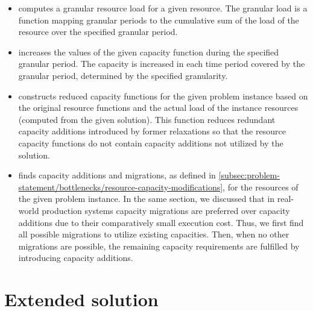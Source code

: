 \begin{itemize}
    \item {}
        computes a granular resource load for a given resource.
        The granular load is a function mapping granular periods to the cumulative sum of the load
        of the resource over the specified granular period.
        
    \item {}
        increases the values of the given capacity function during the specified granular period.
        The capacity is increased in each time period covered by the granular period,
        determined by the specified granularity.

    \item {}
        constructs reduced capacity functions for the given problem instance based on the original resource functions
        and the actual load of the instance resources (computed from the given solution).
        This function reduces redundant capacity additions introduced by former relaxations
        so that the resource capacity functions do not contain capacity additions not utilized by the solution.

    \item {}
        finds capacity additions and migrations,
        as defined in \cref{subsec:problem-statement/bottlenecks/resource-capacity-modifications},
        for the resources of the given problem instance.
        In the same section,
        we discussed that in real-world production systems
        capacity migrations are preferred over capacity additions due to their comparatively small execution cost.
        Thus, we first find all possible migrations to utilize existing capacities.
        Then, when no other migrations are possible, the remaining capacity requirements are fulfilled
        by introducing capacity additions.
\end{itemize}


\section{Extended solution} \label{sec:solution-apporach/extended-solution}


